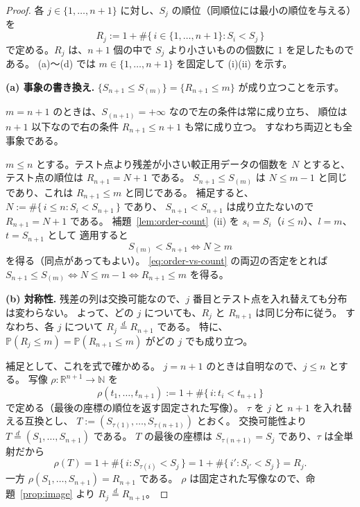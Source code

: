 \documentclass[a4paper,11pt]{jsarticle}
\theoremstyle{definition}
\theoremstyle{plain}
\theoremstyle{remark}
\newcommand{\Prob}{\mathbb{P}}
\newcommand{\Real}{\mathbb{R}}
\newcommand{\eqd}{\overset{d}{=}}               %
\begin{document}
\begin{proof}
  各 $j\in\{1,\dots,n+1\}$ に対し、$S_j$ の順位（同順位には最小の順位を与える）を
  \begin{equation}
    \label{eq:min-rank}
    R_j:=1+\#\{\,i\in\{1,\dots,n+1\}: S_i<S_j\,\}
  \end{equation}
  で定める。$R_j$ は、$n+1$ 個の中で $S_j$ より小さいものの個数に $1$ を足したものである。
  (a)〜(d) では $m\in\{1,\dots,n+1\}$ を固定して (i)(ii) を示す。

  \textbf{(a) 事象の書き換え.}
  $\{S_{n+1}\le S_{(m)}\}=\{R_{n+1}\le m\}$ が成り立つことを示す。

  $m=n+1$ のときは、$S_{(n+1)}=+\infty$ なので左の条件は常に成り立ち、
  順位は $n+1$ 以下なので右の条件 $R_{n+1}\le n+1$ も常に成り立つ。
  すなわち両辺とも全事象である。

  $m\le n$ とする。テスト点より残差が小さい較正用データの個数を $N$ とすると、
  テスト点の順位は $R_{n+1}=N+1$ である。
  $S_{n+1}\le S_{(m)}$ は $N\le m-1$ と同じであり、これは $R_{n+1}\le m$ と同じである。
  補足すると、$N:=\#\{\,i\le n: S_i<S_{n+1}\,\}$ であり、
  $S_{n+1}<S_{n+1}$ は成り立たないので $R_{n+1}=N+1$ である。
  補題~\ref{lem:order-count}~(ii) を $s_i=S_i$（$i\le n$）、$l=m$、$t=S_{n+1}$ として
  適用すると
  \begin{equation}
    \label{eq:order-vs-count}
    S_{(m)}<S_{n+1}\iff N\ge m
  \end{equation}
  を得る（同点があってもよい）。
  \eqref{eq:order-vs-count} の両辺の否定をとれば
  $S_{n+1}\le S_{(m)}\iff N\le m-1\iff R_{n+1}\le m$ を得る。

  \textbf{(b) 対称性.}
  残差の列は交換可能なので、$j$ 番目とテスト点を入れ替えても分布は変わらない。
  よって、どの $j$ についても、$R_j$ と $R_{n+1}$ は同じ分布に従う。
  すなわち、各 $j$ について $R_j\eqd R_{n+1}$ である。
  特に、$\Prob(R_j\le m)=\Prob(R_{n+1}\le m)$ がどの $j$ でも成り立つ。

  補足として、これを式で確かめる。
  $j=n+1$ のときは自明なので、$j\le n$ とする。
  写像 $\rho\colon\Real^{n+1}\to\mathbb{N}$ を
  \begin{equation*}
    \rho(t_1,\dots,t_{n+1}):=1+\#\{\,i: t_i<t_{n+1}\,\}
  \end{equation*}
  で定める（最後の座標の順位を返す固定された写像）。
  $\tau$ を $j$ と $n+1$ を入れ替える互換とし、
  $T:=(S_{\tau(1)},\dots,S_{\tau(n+1)})$ とおく。
  交換可能性より $T\eqd(S_1,\dots,S_{n+1})$ である。
  $T$ の最後の座標は $S_{\tau(n+1)}=S_j$ であり、$\tau$ は全単射だから
  \begin{equation*}
    \rho(T)=1+\#\{\,i: S_{\tau(i)}<S_j\,\}=1+\#\{\,i': S_{i'}<S_j\,\}=R_j.
  \end{equation*}
  一方 $\rho(S_1,\dots,S_{n+1})=R_{n+1}$ である。
  $\rho$ は固定された写像なので、命題~\ref{prop:image} より $R_j\eqd R_{n+1}$。


\end{proof}
\end{document}
